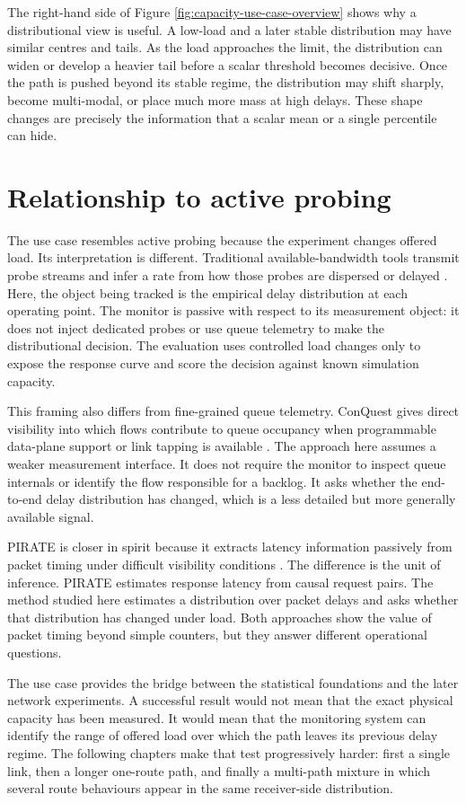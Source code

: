 The right-hand side of Figure \ref{fig:capacity-use-case-overview} shows why a distributional view is useful. A low-load and a later stable distribution may have similar centres and tails. As the load approaches the limit, the distribution can widen or develop a heavier tail before a scalar threshold becomes decisive. Once the path is pushed beyond its stable regime, the distribution may shift sharply, become multi-modal, or place much more mass at high delays. These shape changes are precisely the information that a scalar mean or a single percentile can hide.

\section{Relationship to active probing}

The use case resembles active probing because the experiment changes offered load. Its interpretation is different. Traditional available-bandwidth tools transmit probe streams and infer a rate from how those probes are dispersed or delayed \cite{jainDovrolisPathload,dovrolisPacketDispersion}. Here, the object being tracked is the empirical delay distribution at each operating point. The monitor is passive with respect to its measurement object: it does not inject dedicated probes or use queue telemetry to make the distributional decision. The evaluation uses controlled load changes only to expose the response curve and score the decision against known simulation capacity.

This framing also differs from fine-grained queue telemetry. ConQuest gives direct visibility into which flows contribute to queue occupancy when programmable data-plane support or link tapping is available \cite{chenConQuest}. The approach here assumes a weaker measurement interface. It does not require the monitor to inspect queue internals or identify the flow responsible for a backlog. It asks whether the end-to-end delay distribution has changed, which is a less detailed but more generally available signal.

PIRATE is closer in spirit because it extracts latency information passively from packet timing under difficult visibility conditions \cite{shobhanaPirate}. The difference is the unit of inference. PIRATE estimates response latency from causal request pairs. The method studied here estimates a distribution over packet delays and asks whether that distribution has changed under load. Both approaches show the value of packet timing beyond simple counters, but they answer different operational questions.

The use case provides the bridge between the statistical foundations and the later network experiments. A successful result would not mean that the exact physical capacity has been measured. It would mean that the monitoring system can identify the range of offered load over which the path leaves its previous delay regime. The following chapters make that test progressively harder: first a single link, then a longer one-route path, and finally a multi-path mixture in which several route behaviours appear in the same receiver-side distribution.
